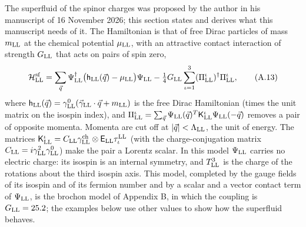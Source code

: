 \documentclass[
  10pt,
]{article}
\begin{document}
The superfluid of the spinor charges was proposed by the author in his
manuscript of 16 November 2026; this section states and derives what
this manuscript needs of it. The Hamiltonian is that of free Dirac
particles of mass \(m_{\rm LL}\) at the chemical potential
\(\mu_{\rm LL}\), with an attractive contact interaction of strength
\(G_{\rm LL}\) that acts on pairs of spin zero,
\[\mathcal H^{\rm sf}_{\rm LL}=\sum_{\vec q}\Psi^\dagger_{\rm LL}\big(\mathsf h_{\rm LL}(\vec q)-\mu_{\rm LL}\big)\Psi_{\rm LL}-\tfrac14G_{\rm LL}\sum_{\iota=1}^3(\Pi^\iota_{\rm LL})^\dagger\Pi^\iota_{\rm LL},\tag{A.13}\]
where
\(\mathsf h_{\rm LL}(\vec q)=\gamma^0_{\rm LL}(\vec\gamma_{\rm LL}\cdot\vec q+m_{\rm LL})\)
is the free Dirac Hamiltonian (times the unit matrix on the isospin
index), and
\(\Pi^\iota_{\rm LL}=\sum_{\vec q}\Psi_{\rm LL}(\vec q)^T\mathsf K^\iota_{\rm LL}\Psi_{\rm LL}(-\vec q)\)
removes a pair of opposite momenta. Momenta are cut off at
\(|\vec q|<\Lambda_{\rm LL}\), the unit of energy. The matrices
\(\mathsf K^\iota_{\rm LL}=C_{\rm LL}\gamma^{\rm ch}_{\rm LL}\otimes\mathsf E_{\rm LL}\tau^{\rm LL}_\iota\)
(with the charge-conjugation matrix
\(C_{\rm LL}=i\gamma^2_{\rm LL}\gamma^0_{\rm LL}\)) make the pair a
Lorentz scalar. In this model \(\Psi_{\rm LL}\) carries no electric
charge: its isospin is an internal symmetry, and \(T^3_{\rm LL}\) is the
charge of the rotations about the third isospin axis. This model,
completed by the gauge fields of its isospin and of its fermion number
and by a scalar and a vector contact term of \(\Psi_{\rm LL}\), is the
brochon model of Appendix B, in which the coupling is
\(G_{\rm LL}=25.2\); the examples below use other values to show how the
superfluid behaves.
\end{document}
